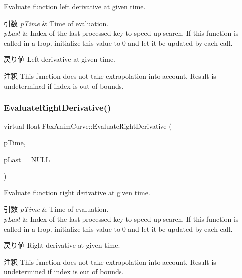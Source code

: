 Evaluate function left derivative at given time. 
\begin{DoxyParams}{引数}
{\em p\+Time} & Time of evaluation. \\
\hline
{\em p\+Last} & Index of the last processed key to speed up search. If this function is called in a loop, initialize this value to 0 and let it be updated by each call. \\
\hline
\end{DoxyParams}
\begin{DoxyReturn}{戻り値}
Left derivative at given time. 
\end{DoxyReturn}
\begin{DoxyRemark}{注釈}
This function does not take extrapolation into account. Result is undetermined if index is out of bounds. 
\end{DoxyRemark}
\mbox{\label{class_fbx_anim_curve_a02a8c8629fafa6a97b37a37fd2e77331}} 
\subsubsection{\texorpdfstring{Evaluate\+Right\+Derivative()}{EvaluateRightDerivative()}}
{\footnotesize\ttfamily virtual float Fbx\+Anim\+Curve\+::\+Evaluate\+Right\+Derivative (\begin{DoxyParamCaption}\item[{\hyperlink{class_fbx_time}{Fbx\+Time}}]{p\+Time,  }\item[{int $\ast$}]{p\+Last = {\ttfamily \hyperlink{fbxarch_8h_a070d2ce7b6bb7e5c05602aa8c308d0c4}{N\+U\+LL}} }\end{DoxyParamCaption})\hspace{0.3cm}{\ttfamily [pure virtual]}}

Evaluate function right derivative at given time. 
\begin{DoxyParams}{引数}
{\em p\+Time} & Time of evaluation. \\
\hline
{\em p\+Last} & Index of the last processed key to speed up search. If this function is called in a loop, initialize this value to 0 and let it be updated by each call. \\
\hline
\end{DoxyParams}
\begin{DoxyReturn}{戻り値}
Right derivative at given time. 
\end{DoxyReturn}
\begin{DoxyRemark}{注釈}
This function does not take extrapolation into account. Result is undetermined if index is out of bounds. 
\end{DoxyRemark}
\mbox{\label{class_fbx_anim_curve_a8982eaf744608ac38457fd6f87990044}} 
